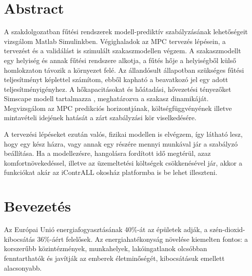 \chapter*{Abstract}

A szakdolgozatban fűtési rendszerek modell-prediktív szabályzásának lehetőségeit vizsgálom Matlab Simulinkben. %
Végighaladok az MPC tervezés lépésein, a tervezést és a validálást is szimulált szakaszmodellen végzem. A szakaszmodellt egy helyiség és annak fűtési rendszere alkotja, a fűtés hője a helyiségből külső homlokzaton távozik a környezet felé. Az állandósult állapotban szükséges fűtési teljesítményt képlettel számítom, ebből kapható a beavatkozó jel egy adott teljesítményigényhez. A hőkapacitásokat és hőátadási, hővezetési tényezőket Simscape modell tartalmazza%
, meghatározva a szakasz dinamikáját. Megvizsgálom az MPC predikciós horizontjának, költségfüggvényének illetve mintavételi idejének hatását a zárt szabályzási kör viselkedésére.  %

A tervezési lépéseket ezután valós, fizikai modellen is elvégzem, így látható lesz, hogy egy kész házra, vagy annak egy részére mennyi munkával jár a szabályzó beállítása. Ha a modellezésre, hangolásra fordított idő megtérül, azaz komfortnövekedéssel, illetve az üzemeltetési költségek csökkenésével jár, akkor a funkciókat akár az iContrALL okosház platformba is be lehet illeszteni.



\chapter{Bevezetés}

Az Európai Unió energiafogyasztásának 40\%-át az épületek adják, a szén-dioxid-kibocsátás 36\%-áért felelősek. Az energiahatékonyság növelése kiemelten fontos: a korszerűbb közintézmények, munkahelyek, lakóingatlanok olcsóbban fenntarthatók és javítják az emberek életminőségét, kibocsátásuk emellett alacsonyabb. %

